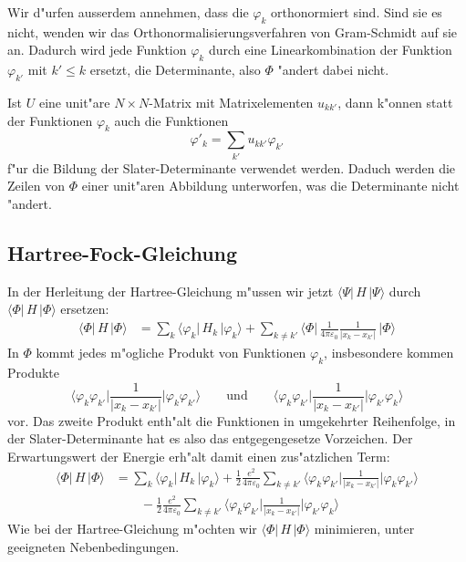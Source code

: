 Wir d"urfen ausserdem annehmen, dass die $\varphi_k$ orthonormiert sind. 
Sind sie es nicht, wenden wir das Orthonormalisierungsverfahren von 
Gram-Schmidt auf sie an. Dadurch wird jede Funktion $\varphi_k$
durch eine Linearkombination der Funktion $\varphi_{k'}$ mit $k'\le k$
ersetzt, die Determinante, also $\Phi$ "andert dabei nicht.

Ist $U$ eine unit"are $N\times N$-Matrix mit Matrixelementen
$u_{kk'}$, dann k"onnen statt der Funktionen $\varphi_k$
auch die Funktionen 
\[
\varphi'_k = \sum_{k'}u_{kk'}\varphi_{k'}
\]
f"ur die Bildung der Slater-Determinante verwendet werden.
Daduch werden die Zeilen von $\Phi$ einer unit"aren Abbildung
unterworfen, was die Determinante nicht "andert.

\subsection{Hartree-Fock-Gleichung}
%
In der Herleitung der Hartree-Gleichung m"ussen wir jetzt
$\langle\Psi|\,H\,|\Psi\rangle$ 
durch
$\langle\Phi|\,H\,|\Phi\rangle$ 
ersetzen:
\begin{align*}
\langle\Phi|\,H\,|\Phi\rangle
&=
\sum_k\langle\varphi_k|\,H_k\,|\varphi_k\rangle
+
\sum_{k\ne k'}\biggl\langle\Phi\biggl|\,
\frac{1}{4\pi\varepsilon_0}
\frac{1}{|x_k-x_{k'}|}
\,\biggr|\Phi\biggr\rangle
\end{align*}
In $\Phi$ kommt jedes m"ogliche Produkt von Funktionen $\varphi_k$,
insbesondere kommen Produkte
\[
\biggl\langle\varphi_k\varphi_{k'}\biggr|
\frac{1}{|x_k-x_{k'}|}
\biggl|\varphi_k\varphi_{k'}\biggr\rangle
\qquad\text{und}\qquad
\biggl\langle\varphi_k\varphi_{k'}\biggr|
\frac{1}{|x_k-x_{k'}|}
\biggl|\varphi_{k'}\varphi_k\biggr\rangle
\]
vor.
Das zweite Produkt enth"alt die Funktionen in umgekehrter Reihenfolge,
in der Slater-Deter\-minante hat es also das entgegengesetze Vorzeichen.
Der Erwartungswert der Energie erh"alt damit einen zus"atzlichen Term:
\begin{align*}
\langle\Phi|\,H\,|\Phi\rangle
&=
\sum_k\langle\varphi_k|\,H_k\,|\varphi_k\rangle
+
\frac12
\frac{e^2}{4\pi\varepsilon_0}
\sum_{k\ne k'}
\biggl\langle\varphi_k\varphi_{k'}\biggr|
\frac{1}{|x_k-x_{k'}|}
\biggl|\varphi_k\varphi_{k'}\biggr\rangle
\\
&\qquad
-
\frac12
\frac{e^2}{4\pi\varepsilon_0}
\sum_{k\ne k'}
\biggl\langle\varphi_k\varphi_{k'}\biggr|
\frac{1}{|x_k-x_{k'}|}
\biggl|\varphi_{k'}\varphi_k\biggr\rangle
\end{align*}
Wie bei der Hartree-Gleichung m"ochten wir
$\langle\Phi|\,H\,|\Phi\rangle$ 
minimieren, unter geeigneten Nebenbedingungen.

